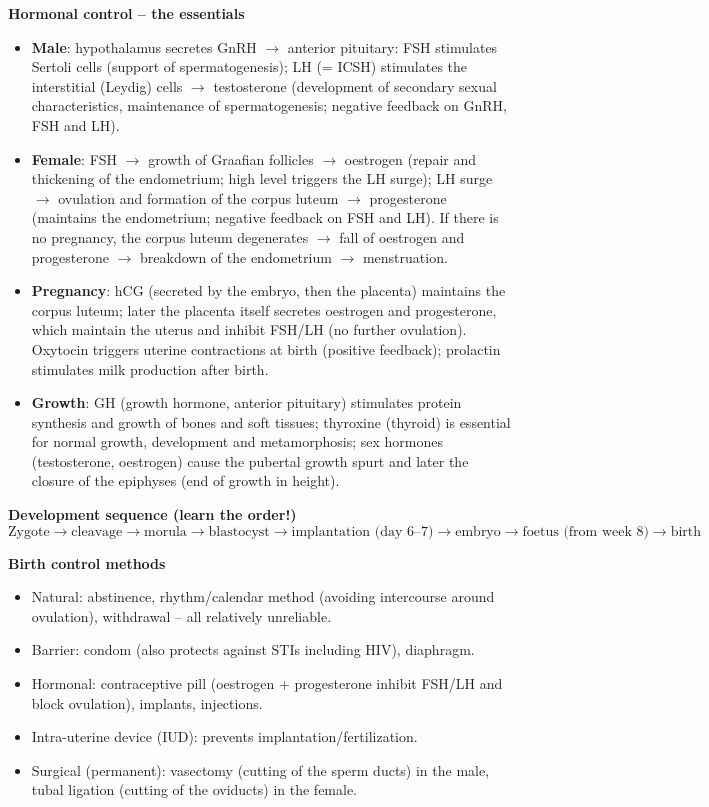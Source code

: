 \documentclass[11pt]{article}
\newcommand{\cle}[1]{{\popxbold\color{popdark}#1}}
\begin{document}
\begin{bilan}
\textbf{Hormonal control -- the essentials}
\begin{itemize}
\item \textbf{Male}: hypothalamus secretes \cle{GnRH} $\rightarrow$ anterior pituitary: \cle{FSH} stimulates Sertoli cells (support of spermatogenesis); \cle{LH} (= ICSH) stimulates the interstitial (Leydig) cells $\rightarrow$ \cle{testosterone} (development of secondary sexual characteristics, maintenance of spermatogenesis; negative feedback on GnRH, FSH and LH).
\item \textbf{Female}: \cle{FSH} $\rightarrow$ growth of Graafian follicles $\rightarrow$ \cle{oestrogen} (repair and thickening of the endometrium; high level triggers the LH surge); \cle{LH} surge $\rightarrow$ \cle{ovulation} and formation of the corpus luteum $\rightarrow$ \cle{progesterone} (maintains the endometrium; negative feedback on FSH and LH). If there is no pregnancy, the corpus luteum degenerates $\rightarrow$ fall of oestrogen and progesterone $\rightarrow$ breakdown of the endometrium $\rightarrow$ menstruation.
\item \textbf{Pregnancy}: \cle{hCG} (secreted by the embryo, then the placenta) maintains the corpus luteum; later the placenta itself secretes oestrogen and progesterone, which maintain the uterus and inhibit FSH/LH (no further ovulation). \cle{Oxytocin} triggers uterine contractions at birth (positive feedback); \cle{prolactin} stimulates milk production after birth.
\item \textbf{Growth}: \cle{GH} (growth hormone, anterior pituitary) stimulates protein synthesis and growth of bones and soft tissues; \cle{thyroxine} (thyroid) is essential for normal growth, development and metamorphosis; sex hormones (testosterone, oestrogen) cause the pubertal growth spurt and later the closure of the epiphyses (end of growth in height).
\end{itemize}

\textbf{Development sequence (learn the order!)}
\[
\text{Zygote} \rightarrow \text{cleavage} \rightarrow \text{morula} \rightarrow \text{blastocyst} \rightarrow \text{implantation (day 6--7)} \rightarrow \text{embryo} \rightarrow \text{foetus (from week 8)} \rightarrow \text{birth}
\]

\textbf{Birth control methods}
\begin{itemize}
\item Natural: abstinence, rhythm/calendar method (avoiding intercourse around ovulation), withdrawal -- all relatively unreliable.
\item Barrier: condom (also protects against STIs including HIV), diaphragm.
\item Hormonal: contraceptive pill (oestrogen + progesterone inhibit FSH/LH and block ovulation), implants, injections.
\item Intra-uterine device (IUD): prevents implantation/fertilization.
\item Surgical (permanent): vasectomy (cutting of the sperm ducts) in the male, tubal ligation (cutting of the oviducts) in the female.
\end{itemize}


\end{bilan}
\end{document}
